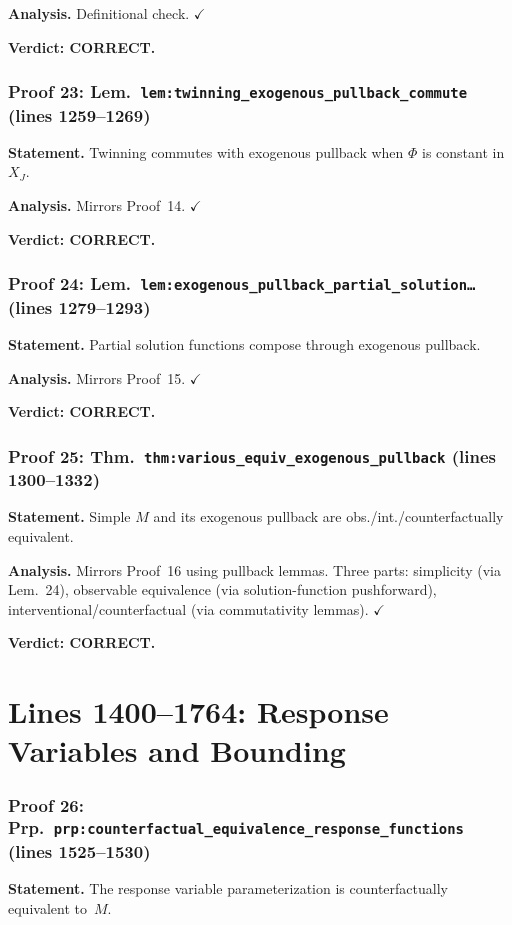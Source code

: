 \documentclass{article}
\begin{document}
\textbf{Analysis.} Definitional check.  $\checkmark$

\textbf{Verdict: CORRECT.}

\section{Proof 23: Lem.\ \texttt{lem:twinning\_exogenous\_pullback\_commute}
(lines 1259--1269)}
\textbf{Statement.} Twinning commutes with exogenous pullback when $\Phi$
is constant in $X_J$.

\textbf{Analysis.} Mirrors Proof~14.  $\checkmark$

\textbf{Verdict: CORRECT.}

\section{Proof 24: Lem.\ \texttt{lem:exogenous\_pullback\_partial\_solution\ldots}
(lines 1279--1293)}
\textbf{Statement.} Partial solution functions compose through exogenous pullback.

\textbf{Analysis.} Mirrors Proof~15.  $\checkmark$

\textbf{Verdict: CORRECT.}

\section{Proof 25: Thm.\ \texttt{thm:various\_equiv\_exogenous\_pullback}
(lines 1300--1332)}
\textbf{Statement.} Simple $M$ and its exogenous pullback are obs./int./counterfactually
equivalent.

\textbf{Analysis.} Mirrors Proof~16 using pullback lemmas.  Three parts:
simplicity (via Lem.~24), observable equivalence (via solution-function
pushforward), interventional/counterfactual (via commutativity lemmas).
$\checkmark$

\textbf{Verdict: CORRECT.}

\part*{Lines 1400--1764: Response Variables and Bounding}

\section{Proof 26: Prp.\ \texttt{prp:counterfactual\_equivalence\_response\_functions}
(lines 1525--1530)}
\textbf{Statement.} The response variable parameterization is counterfactually
equivalent to~$M$.
\end{document}
